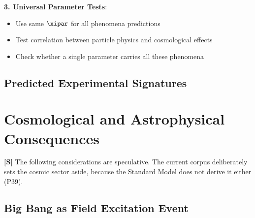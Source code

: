 	\textbf{3. Universal Parameter Tests}:
	\begin{itemize}
		\item Use same $\xipar$ for all phenomena predictions
		\item Test correlation between particle physics and cosmological effects
		\item Check whether a single parameter carries all these phenomena
	\end{itemize}
	
	\subsection{Predicted Experimental Signatures}
	
	\begin{table}[htbp]
		\centering
		\caption{Predicted experimental signatures of node theory}
		\label{tab:experimental_signatures}
	\end{table}
	
	\section{Cosmological and Astrophysical Consequences}
	
	\textbf{[S]} The following considerations are speculative. The current corpus deliberately sets the cosmic sector aside, because the Standard Model does not derive it either (P39).
	
	\subsection{Big Bang as Field Excitation Event}
	
